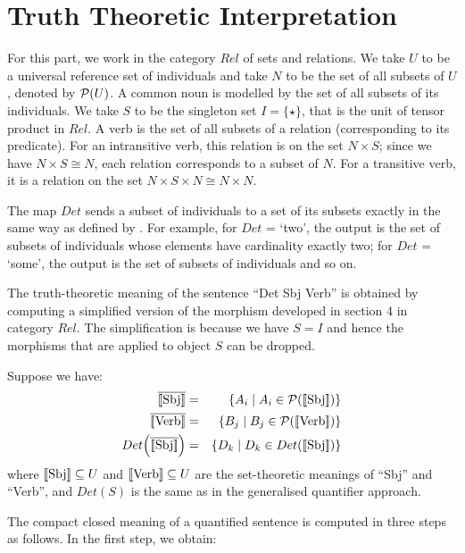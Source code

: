 \section{Truth Theoretic Interpretation}

For this part, we work in the category $Rel$ of sets and relations.  We take $U$ to be a universal reference set of individuals  and take $N$ to be the set of all  subsets of $U$, denoted by ${\cal P}(U)$. A common noun is modelled by the set of all subsets of  its individuals.    We take $S$ to be the singleton set $I = \{\star\}$, that is the unit of tensor product in $Rel$.  A verb is the set of all  subsets  of a relation (corresponding to its predicate). For an intransitive verb, this relation is on the set $N \times S$; since we have $N \times S \cong N$,  each relation corresponds to a subset of $N$.  For a transitive verb, it is a relation on the set $N \times S \times N \cong N \times N$. 



The map $Det$ sends a subset of individuals to a set of its subsets exactly in the same way as defined by \cite{BarwiseCooper81}. For example, for $Det$ = `two', the output is the set of subsets  of individuals whose elements have cardinality exactly two; for $Det$ = `some', the output is the set of  subsets of individuals and so on. 

The truth-theoretic meaning of the sentence ``Det Sbj Verb''  is obtained  by computing a simplified version of the   morphism  developed in section 4 in category $Rel$. The simplification is because we have $S = I$ and hence the morphisms that are applied to object $S$ can be dropped. 

Suppose we have:
\begin{eqnarray*}
\overline{\semantics{\text{Sbj}}} &=& \{A_i \mid A_i \in {\cal P}(\semantics{\text{Sbj}})\}\\
\overline{\semantics{\text{Verb}}} &=& \{B_j \mid B_j \in {\cal P}(\semantics{\text{Verb}})\}\\
Det\Big(\overline{\semantics{\text{Sbj}}}\Big) &=& \{D_k \mid D_k \in Det(\semantics{\text{Sbj}})\}
\end{eqnarray*}
where   $[\![ \text{Sbj} ]\!] \subseteq U$ and $[\![ \text{Verb} ]\!] \subseteq U$ are the set-theoretic meanings of ``Sbj'' and ``Verb'', and $Det(S)$  is the same as in the generalised quantifier approach. 

The compact closed meaning of a quantified sentence is computed in three steps as follows. In the  first step, we obtain:

